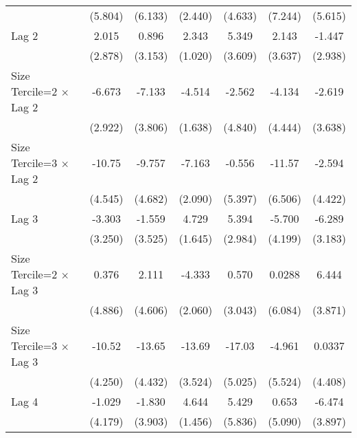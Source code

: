 \begin{table}[htbp]
\begin{tabular}{l*{6}{c}}
                &  (5.804)         &  (6.133)         &  (2.440)         &  (4.633)         &  (7.244)         &  (5.615)         \\
\addlinespace
Lag 2           &    2.015         &    0.896         &    2.343\sym{*}  &    5.349         &    2.143         &   -1.447         \\
                &  (2.878)         &  (3.153)         &  (1.020)         &  (3.609)         &  (3.637)         &  (2.938)         \\
\addlinespace
Size Tercile=2 $\times$ Lag 2&   -6.673\sym{*}  &   -7.133         &   -4.514\sym{**} &   -2.562         &   -4.134         &   -2.619         \\
                &  (2.922)         &  (3.806)         &  (1.638)         &  (4.840)         &  (4.444)         &  (3.638)         \\
\addlinespace
Size Tercile=3 $\times$ Lag 2&   -10.75\sym{*}  &   -9.757\sym{*}  &   -7.163\sym{***}&   -0.556         &   -11.57         &   -2.594         \\
                &  (4.545)         &  (4.682)         &  (2.090)         &  (5.397)         &  (6.506)         &  (4.422)         \\
\addlinespace
Lag 3           &   -3.303         &   -1.559         &    4.729\sym{**} &    5.394         &   -5.700         &   -6.289\sym{*}  \\
                &  (3.250)         &  (3.525)         &  (1.645)         &  (2.984)         &  (4.199)         &  (3.183)         \\
\addlinespace
Size Tercile=2 $\times$ Lag 3&    0.376         &    2.111         &   -4.333\sym{*}  &    0.570         &   0.0288         &    6.444         \\
                &  (4.886)         &  (4.606)         &  (2.060)         &  (3.043)         &  (6.084)         &  (3.871)         \\
\addlinespace
Size Tercile=3 $\times$ Lag 3&   -10.52\sym{*}  &   -13.65\sym{**} &   -13.69\sym{***}&   -17.03\sym{***}&   -4.961         &   0.0337         \\
                &  (4.250)         &  (4.432)         &  (3.524)         &  (5.025)         &  (5.524)         &  (4.408)         \\
\addlinespace
Lag 4           &   -1.029         &   -1.830         &    4.644\sym{**} &    5.429         &    0.653         &   -6.474         \\
                &  (4.179)         &  (3.903)         &  (1.456)         &  (5.836)         &  (5.090)         &  (3.897)         \\

\end{tabular}
\end{table}
